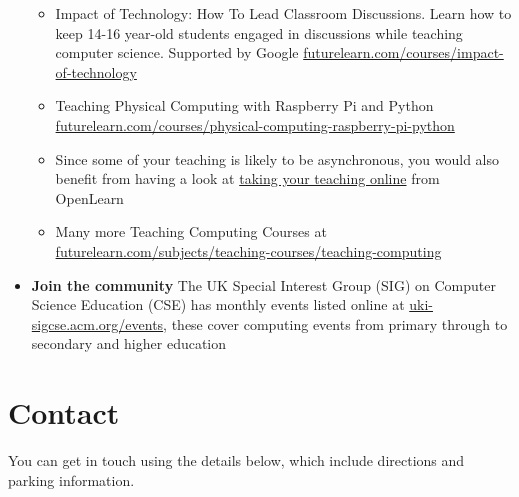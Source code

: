 \documentclass[
  12pt,
]{book}
\providecommand{\tightlist}{%
  \setlength{\itemsep}{0pt}\setlength{\parskip}{0pt}}
\begin{document}
\begin{itemize}
  \begin{itemize}
  \tightlist
  \item
    Impact of Technology: How To Lead Classroom Discussions. Learn how to keep 14-16 year-old students engaged in discussions while teaching computer science. Supported by Google \href{https://www.futurelearn.com/courses/impact-of-technology}{futurelearn.com/courses/impact-of-technology}
  \item
    Teaching Physical Computing with Raspberry Pi and Python \href{https://www.futurelearn.com/courses/physical-computing-raspberry-pi-python}{futurelearn.com/courses/physical-computing-raspberry-pi-python}
  \item
    Since some of your teaching is likely to be asynchronous, you would also benefit from having a look at \href{https://www.open.edu/openlearn/education-development/education/take-your-teaching-online/content-section-overview}{taking your teaching online} from OpenLearn
  \item
    Many more Teaching Computing Courses at \href{https://www.futurelearn.com/subjects/teaching-courses/teaching-computing}{futurelearn.com/subjects/teaching-courses/teaching-computing}
  \end{itemize}
\item
  \textbf{Join the community} The UK Special Interest Group (SIG) on Computer Science Education (CSE) has monthly events listed online at \href{https://uki-sigcse.acm.org/events}{uki-sigcse.acm.org/events}, these cover computing events from primary through to secondary and higher education
\end{itemize}

\hypertarget{contact}{%
\chapter{Contact}\label{contact}}

You can get in touch using the details below, which include directions and parking information.
\end{document}
